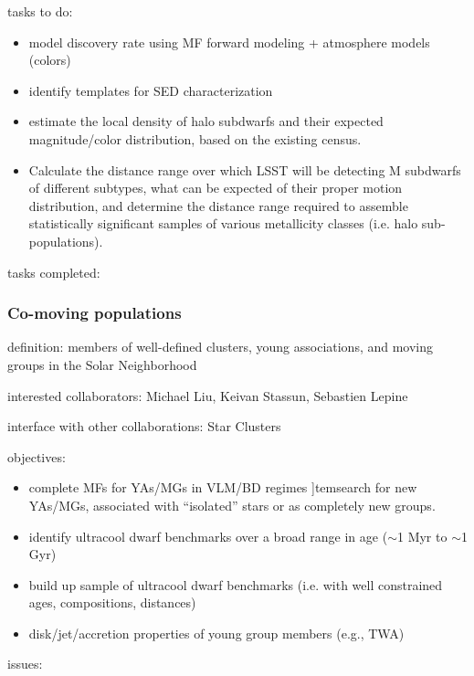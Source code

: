 tasks to do: 
\begin{itemize}
\item{model 
discovery rate using MF forward modeling + atmosphere models (colors) }
\item{identify 
templates for SED characterization }
\item{estimate 
the local density of halo subdwarfs and their expected magnitude/color 
distribution, based on the existing census. }
\item{Calculate the distance range over which LSST  will be detecting M subdwarfs of different subtypes, what can be expected of their  proper motion distribution, and determine the distance range required to assemble  statistically significant samples of various metallicity classes (i.e. halo sub-populations). }
\end{itemize}

tasks completed: 


\subsubsection{Co-moving populations}

definition: members of well-defined clusters, 
young associations, and moving groups in the  Solar Neighborhood 

interested collaborators: 
Michael Liu, Keivan Stassun, Sebastien Lepine 

interface with other collaborations: 
Star 
Clusters 

objectives: 
\begin{itemize}
\item{complete 
MFs for YAs/MGs in VLM/BD regimes }
]tem{search 
for new YAs/MGs, 
associated with “isolated” stars or as completely new groups. }
\item{identify 
ultracool dwarf benchmarks over a broad range in age ($\sim$1 Myr to $\sim$1 Gyr) }
\item{build 
up sample of ultracool dwarf benchmarks (i.e. with well constrained ages, 
compositions, distances) }
\item{disk/jet/accretion 
properties of young group members (e.g., TWA) }
\end{itemize}


issues: 


